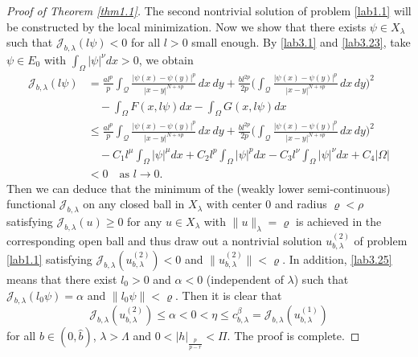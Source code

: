 \documentclass[10pt,a4paper]{amsart}
\numberwithin{equation}{section}
\begin{document}
\begin{proof}[Proof of Theorem \ref{thm1.1}]
The second nontrivial solution of problem \eqref{lab1.1} will be constructed by the 
local minimization. Now we show that there exists $\psi \in X_\lambda$ such that 
$\mathcal{J}_{b,\lambda}(l \psi)<0$ for all $l>0$ small enough. By \eqref{lab3.1} 
and \eqref{lab3.23}, take $\psi\in E_0$ with $\int_\Omega |\psi|^\nu dx>0$, 
we obtain 
\begin{equation}\label{lab3.25}
\begin{split}
 \mathcal{J}_{b,\lambda}(l\psi)
&= \frac{al^p}{p}\int_\mathcal{Q}\frac{|\psi(x)-\psi(y)|^p}{|x-y|^{N+sp}}\,dx\,dy
+\frac{bl^{2p}}{2p}\Big(\int_\mathcal{Q}\frac{|\psi(x)-\psi(y)|^p}{|x-y|^{N+sp}}\,dx\,dy\Big)^2 \\
&\quad -\int_\Omega F(x, l\psi)dx-\int_\Omega G(x, l\psi)dx \\
&\leq  \frac{al^p}{p}\int_{\mathcal{Q}}\frac{|\psi(x)-\psi(y)|^p}{|x-y|^{N+sp}}\,dx\,dy
+\frac{bl^{2p}}{2p}\Big(\int_\mathcal{Q}\frac{|\psi(x)-\psi(y)|^p}{|x-y|^{N+sp}}\,dx\,dy
 \Big)^2 \\
&\quad -C_1l^\mu\int_{\Omega}|\psi|^\mu dx+C_2l^p\int_{\Omega}|\psi|^pdx-C_3l^\nu\int_{\Omega}|\psi|^\nu dx+C_4|\Omega|  \\
&<0\quad \text{as } l\to 0.
\end{split}
\end{equation}
Then we can deduce that the minimum of the (weakly lower semi-continuous) functional 
$\mathcal{J}_{b,\lambda}$ on any closed ball in $X_\lambda$ with center 0 and radius 
$\varrho<\rho$ satisfying $\mathcal{J}_{b,\lambda}(u)\geq0$ for any $u\in X_\lambda$ 
with $\|u\|_\lambda=\varrho$ is achieved in the corresponding open ball and thus draw 
out a nontrivial solution $u^{(2)}_{b,\lambda}$ of problem \eqref{lab1.1} satisfying 
$\mathcal{J}_{b,\lambda}(u^{(2)}_{b,\lambda})<0$ and $\|u^{(2)}_{b,\lambda}\|<\varrho$. 
In addition, \eqref{lab3.25} means that there exist $l_0>0$ and $\alpha<0$ 
(independent of $\lambda$) such that $\mathcal{J}_{b,\lambda}(l_0 \psi)=\alpha$ and 
$\|l_0 \psi\|<\varrho$. Then it is clear that
\begin{equation}\label{lab3.26}
 \mathcal{J}_{b,\lambda}(u^{(2)}_{b,\lambda})
 \leq\alpha<0<\eta\leq c_{b,\lambda}^\beta=\mathcal{J}_{b,\lambda}(u^{(1)}_{b,\lambda})
\end{equation}
for all $b\in(0, \widehat{b})$, $\lambda>\Lambda$ and $0<|h|_{\frac{p}{p-r}}<\Pi$. 
The proof is complete.
\end{proof}
\end{document}
